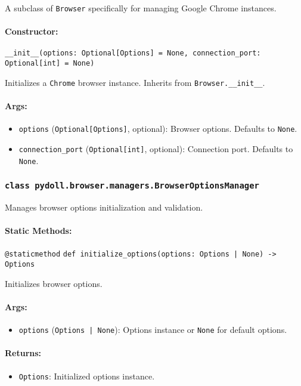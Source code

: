 \documentclass{article}
\begin{document}
\noindent A subclass of \texttt{Browser} specifically for managing Google Chrome instances.

\paragraph{Constructor:}
\noindent\texttt{\_\_init\_\_(options: Optional[Options] = None, connection\_port: Optional[int] = None)}

\noindent Initializes a \texttt{Chrome} browser instance. Inherits from \texttt{Browser.\_\_init\_\_}.

\paragraph{Args:}
\begin{itemize}
    \item \texttt{options} (\texttt{Optional[Options]}, optional): Browser options. Defaults to \texttt{None}.
    \item \texttt{connection\_port} (\texttt{Optional[int]}, optional): Connection port. Defaults to \texttt{None}.
\end{itemize}

\subsubsection*{\texttt{class pydoll.browser.managers.BrowserOptionsManager}}
\noindent Manages browser options initialization and validation.

\paragraph{Static Methods:}
\noindent\texttt{@staticmethod}
\noindent\texttt{def initialize\_options(options: Options | None) -> Options}

\noindent Initializes browser options.

\paragraph{Args:}
\begin{itemize}
    \item \texttt{options} (\texttt{Options | None}): Options instance or \texttt{None} for default options.
\end{itemize}

\paragraph{Returns:}
\begin{itemize}
    \item \texttt{Options}: Initialized options instance.
\end{itemize}
\end{document}
